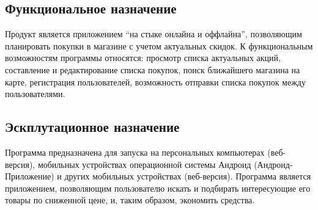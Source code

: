 \subsection{Функциональное назначение}
Продукт является приложением ``на стыке онлайна и оффлайна'', позволяющим планировать
покупки в магазине с учетом актуальных скидок. 
К функциональным возможностям программы относятся:
просмотр списка актуальных акций,
составление и редактирование списка покупок, 
поиск ближайшего магазина на карте,
регистрация пользователей,
возможность отправки списка покупок между пользователями.

\subsection{Эскплутационное назначение}
Программа предназначена для запуска на персональных компьютерах (веб-версия), мобильных устройствах операционной
системы Андроид (Андроид-Приложение) и других мобильных устройствах (веб-версия). Программа является 
приложением, позволяющим пользователю искать и подбирать интересующие его товары по сниженной цене, и, таким образом, экономить
средства. 



